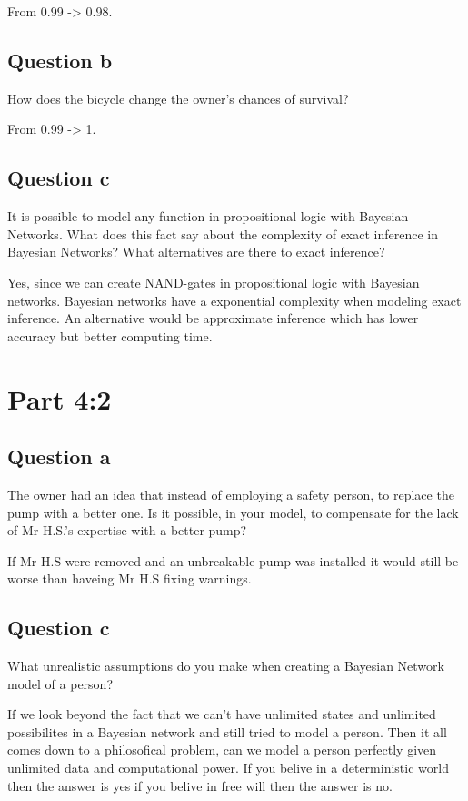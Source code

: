 \documentclass[a4paper,12pt]{article}
\begin{document}
From 0.99 -> 0.98.

\subsection*{Question b}
How does the bicycle change the owner's chances of survival? 

From 0.99 -> 1.

\subsection*{Question c}
It is possible to model any function in propositional logic with Bayesian Networks. What does this fact say about the complexity of exact inference in Bayesian Networks? What alternatives are there to exact inference? 

Yes, since we can create NAND-gates in propositional logic with Bayesian networks. Bayesian networks have a exponential complexity when modeling exact inference. An alternative would be approximate inference which has lower accuracy but better computing time.

\section*{Part 4:2}

\subsection*{Question a}
The owner had an idea that instead of employing a safety person, to replace the pump with a better one. Is it possible, in your model, to compensate for the lack of Mr H.S.'s expertise with a better pump? 

If Mr H.S were removed and an unbreakable pump was installed it would still be worse than haveing Mr H.S fixing warnings.

\subsection*{Question c}
What unrealistic assumptions do you make when creating a Bayesian Network model of a person? 

If we look beyond the fact that we can't have unlimited states and unlimited possibilites in a Bayesian network and still tried to model a person. Then it all comes down to a philosofical problem, can we model a person perfectly given unlimited data and computational power. If you belive in a deterministic world then the answer is yes if you belive in free will then the answer is no.
\end{document}
